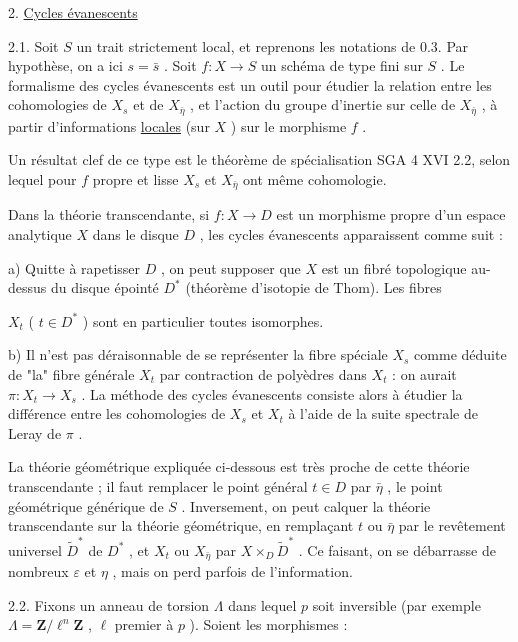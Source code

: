 2. \underline{Cycles évanescents}

2.1.    Soit  $S$  un trait strictement local, et reprenons les notations de 0.3. Par hypothèse, on a ici  $s = \bar{s}$ . Soit  $f : X \longrightarrow S$  un schéma de type fini sur  $S$ . Le formalisme des cycles évanescents est un outil pour étudier la relation entre les cohomologies de  $X_s$  et de  $X_{\bar{\eta}}$ , et l'action du groupe d'inertie sur celle de  $X_{\bar{\eta}}$ , à partir d'informations \underline{locales} (sur  $X$ ) sur le morphisme  $f$ .

Un résultat clef de ce type est le théorème de spécialisation SGA 4 XVI 2.2, selon lequel pour  $f$  propre et lisse  $X_s$  et  $X_{\bar{\eta}}$  ont même cohomologie.

Dans la théorie transcendante, si  $f : X \longrightarrow D$  est un morphisme propre d'un espace analytique  $X$  dans le disque  $D$ , les cycles évanescents apparaissent comme suit :

a) Quitte à rapetisser  $D$ , on peut supposer que  $X$  est un fibré topologique au-dessus du disque épointé  $D^{*}$  (théorème d'isotopie de Thom). Les fibres



$X_t$ ( $t \in D^{*}$ )  sont en particulier toutes isomorphes.

b) Il n'est pas déraisonnable de se représenter la fibre spéciale  $X_s$  comme déduite de "la" fibre générale  $X_t$  par contraction de polyèdres dans  $X_t$ : on aurait $\pi : X_t \longrightarrow X_s$ . La méthode des cycles évanescents consiste alors à étudier la différence entre les cohomologies de  $X_s$  et  $X_t$  à l'aide de la suite spectrale de Leray de  $\pi$ .

La théorie géométrique expliquée ci-dessous est très proche de cette théorie transcendante ; il faut remplacer le point général  $t \in D$  par  $\bar{\eta}$ , le point géométrique générique de  $S$ . Inversement, on peut calquer la théorie transcendante sur la théorie géométrique, en remplaçant  $t$  ou  $\bar{\eta}$  par le revêtement universel  $\widetilde{D}^{*}$  de  $D^{*}$ , et $X_t$  ou  $X_{\bar{\eta}}$  par  $X \times_D \widetilde{D}^{*}$ . Ce faisant, on se débarrasse de nombreux  $\varepsilon$  et  $\eta$ , mais on perd parfois de l'information.

2.2. Fixons un anneau de torsion  $\Lambda$  dans lequel  $p$  soit inversible (par exemple $\Lambda = \mathbf{Z}/\ell^n\mathbf{Z}$ ,  $\ell$  premier à  $p$ ). Soient les morphismes :

